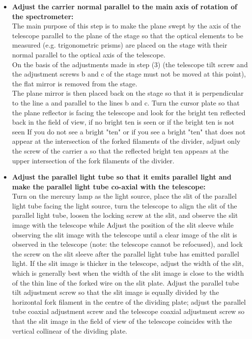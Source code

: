 \documentclass[UTF8]{article}
\begin{document}
 \begin{itemize}
                     \item \textbf{Adjust the carrier normal parallel to the main axis of rotation of the spectrometer:}\\
                     The main purpose of this step is to make the plane swept by the axis of the telescope parallel to the plane of the stage so that the optical elements to be measured (e.g. trigonometric prisms) are placed on the stage with their normal parallel to the optical axis of the telescope.\\
                     On the basis of the adjustments made in step (3) (the telescope tilt screw and the adjustment screws b and c of the stage must not be moved at this point), the flat mirror is removed from the stage.\\
                     The plane mirror is then placed back on the stage so that it is perpendicular to the line a and parallel to the lines b and c. Turn the cursor plate so that the plane reflector is facing the telescope and look for the bright ten reflected back in the field of view, if no bright ten is seen or if the bright ten is not seen If you do not see a bright "ten" or if you see a bright "ten" that does not appear at the intersection of the forked filaments of the divider, adjust only the screw of the carrier a so that the reflected bright ten appears at the upper intersection of the fork filaments of the divider.
                     \item \textbf{Adjust the parallel light tube so that it emits parallel light and make the parallel light tube co-axial with the telescope:}\\
                     Turn on the mercury lamp as the light source, place the slit of the parallel light tube facing the light source, turn the telescope to align the slit of the parallel light tube, loosen the locking screw at the slit, and observe the slit image with the telescope while Adjust the position of the slit sleeve while observing the slit image with the telescope until a clear image of the slit is observed in the telescope (note: the telescope cannot be refocused), and lock the screw on the slit sleeve after the parallel light tube has emitted parallel light. If the slit image is thicker in the telescope, adjust the width of the slit, which is generally best when the width of the slit image is close to the width of the thin line of the forked wire on the slit plate. Adjust the parallel tube tilt adjustment screw so that the slit image is equally divided by the horizontal fork filament in the centre of the dividing plate; adjust the parallel tube coaxial adjustment screw and the telescope coaxial adjustment screw so that the slit image in the field of view of the telescope coincides with the vertical collinear of the dividing plate.
        \end{itemize} 
\end{document}
